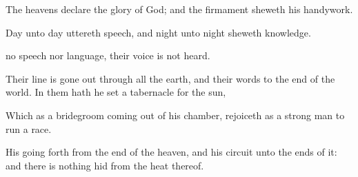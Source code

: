 {\Q {}The
heavens
declare the
glory of
God; and the
firmament sheweth
his
handywork.


\par }{\Q {}Day unto
day
uttereth
speech, and
night unto
night
sheweth
knowledge.


\par }{\Q {} no
speech nor
language,
{} their
voice is not
heard.


\par }{\Q {}Their
line is gone
out through all the
earth, and their
words to the
end of the
world. In them hath he
set a
tabernacle for the
sun,


\par }{\Q {}Which
{} as a
bridegroom coming
out of his
chamber,
{}
rejoiceth as a strong
man to
run a
race.


\par }{\Q {}His going
forth
{} from the
end of the
heaven, and his
circuit unto the
ends of it: and there is nothing
hid from the
heat thereof.


\par }{\BB \par }
